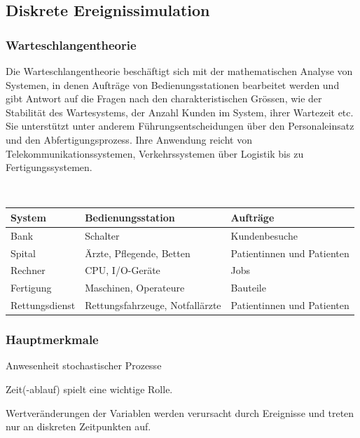 \subsection{Diskrete Ereignissimulation}
\subsubsection{Warteschlangentheorie}
Die Warteschlangentheorie beschäftigt sich mit der mathematischen Analyse von Systemen, in denen Aufträge von Bedienungsstationen bearbeitet werden und gibt Antwort auf die Fragen nach den charakteristischen Grössen, wie der Stabilität des Wartesystems, der Anzahl Kunden im System, ihrer Wartezeit etc. Sie unterstützt unter anderem Führungsentscheidungen über den Personaleinsatz und den Abfertigungsprozess. Ihre Anwendung reicht von Telekommunikationssystemen, Verkehrssystemen über Logistik bis zu Fertigungssystemen.
\begin{example}\\
	\begin{tabular}{|l|l|l|}
		\hline
		\textbf{System} & \textbf{Bedienungsstation} & \textbf{Aufträge} \\ \hline
		Bank & Schalter & Kundenbesuche \\ \hline
		Spital & Ärzte, Pflegende, Betten & Patientinnen und Patienten \\ \hline
		Rechner & CPU, I/O-Geräte & Jobs \\ \hline
		Fertigung & Maschinen, Operateure & Bauteile \\ \hline
		Rettungsdienst & Rettungsfahrzeuge, Notfallärzte & Patientinnen und Patienten \\ \hline		
	\end{tabular}
\end{example}

\subsubsection{Hauptmerkmale}
\begin{compactitem}
	\item Anwesenheit stochastischer Prozesse
	\item Zeit(-ablauf) spielt eine wichtige Rolle.
	\item Wertveränderungen der Variablen werden verursacht durch Ereignisse und treten nur an diskreten Zeitpunkten auf.
\end{compactitem}


